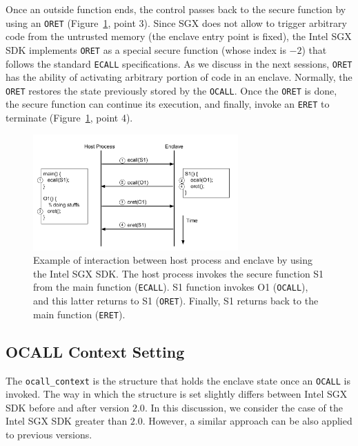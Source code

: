 Once an outside function ends, the control passes back to the secure function 
by using an \texttt{ORET} (Figure~\ref{fig:synch-exit}, point 3).
Since SGX does not allow to trigger arbitrary code from the untrusted memory 
(\ie the enclave entry point is fixed),
the Intel SGX SDK implements \texttt{ORET} as a special secure function (whose 
index is $-2$) that follows the standard \texttt{ECALL} specifications.
As we discuss in the next sessions, \texttt{ORET} has the ability of activating
arbitrary portion of code in an enclave. 
Normally, the \texttt{ORET} restores the state previously 
stored by the \texttt{OCALL}.
Once the \texttt{ORET} is done, the secure function can continue its execution,
and finally, invoke an \texttt{ERET} to terminate 
(Figure~\ref{fig:synch-exit}, point 4).

\begin{figure}[t]
	\centering
	\includegraphics[width=0.7\textwidth]{fig_c5/synch-exit.pdf}
	\caption[SGX-Host interaction.]{Example of interaction between host 
		process and enclave by using the Intel SGX SDK. The host process 
		invokes 
		the secure function S1 from the main function (\texttt{ECALL}). S1 
		function 
		invokes O1 (\texttt{OCALL}), and this latter returns to S1 
		(\texttt{ORET}). 
		Finally, S1 returns back to the main function (\texttt{ERET}).}
	\label{fig:synch-exit}
\end{figure}

\subsection{OCALL Context Setting}
\label{ssec:ocall-context}

The \texttt{ocall\_context} is the structure that holds the enclave state once 
an \texttt{OCALL} is invoked.
The way in which the structure is set slightly differs between Intel SGX SDK 
before and after version $2.0$.
In this discussion, we consider the case of the Intel SGX SDK greater than 
$2.0$. However, a similar approach can be also applied to previous versions.

